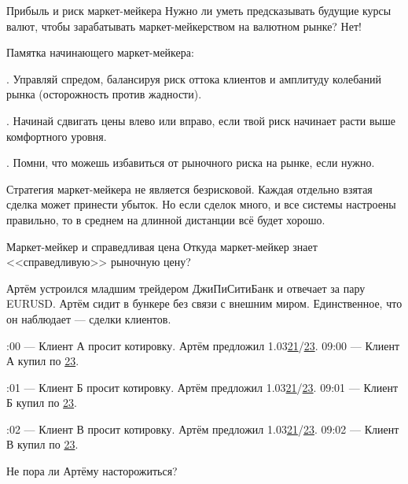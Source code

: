 \documentclass{beamer}
\newcommand{\eurusdBigFigures}{1.03}
\begin{document}
\begin{frame}{Прибыль и риск маркет-мейкера}
\justify
Нужно ли уметь предсказывать будущие курсы валют, чтобы зарабатывать маркет-мейкерством на валютном рынке? Нет!

\justify
Памятка начинающего маркет-мейкера:

. Управляй спредом, балансируя риск оттока клиентов и амплитуду колебаний рынка (осторожность против жадности).

. Начинай сдвигать цены влево или вправо, если твой риск начинает расти выше комфортного уровня.

. Помни, что можешь избавиться от рыночного риска на рынке, если нужно.

\justify
Стратегия маркет-мейкера не является безрисковой. Каждая отдельно взятая сделка
может принести убыток. Но если сделок много, и все системы настроены правильно,
то в среднем на длинной дистанции всё будет хорошо.
\end{frame}



\begin{frame}{Маркет-мейкер и справедливая цена}
\justify
Откуда маркет-мейкер знает <<справедливую>> рыночную цену?

\justify
Артём устроился младшим трейдером ДжиПиСитиБанк и отвечает за пару EURUSD. Артём сидит в бункере без связи с внешним миром. Единственное, что он наблюдает --- сделки клиентов.

:00 --- Клиент А просит котировку. Артём предложил \eurusdBigFigures\underline{21}/\underline{23}. 
09:00 --- Клиент А купил по \underline{23}.

:01 --- Клиент Б просит котировку. Артём предложил \eurusdBigFigures\underline{21}/\underline{23}.
09:01 --- Клиент Б купил по \underline{23}.

:02 --- Клиент В просит котировку. Артём предложил \eurusdBigFigures\underline{21}/\underline{23}. 
09:02 --- Клиент В купил по \underline{23}.

\justify
Не пора ли Артёму насторожиться?
\end{frame}
\end{document}
